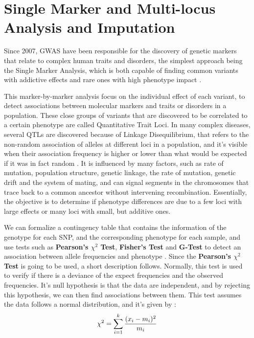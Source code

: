 \section{Single Marker and Multi-locus Analysis and Imputation}


Since 2007, \gls{GWAS} have been responsible for the discovery of genetic markers that relate to complex human traits and disorders, the simplest approach being the Single Marker Analysis, which is both capable of finding common variants with addictive effects and rare ones with high phenotype impact \cite{scott2007genome}.
 
This marker-by-marker analysis focus on the individual effect of each variant, to detect associations between molecular markers and traits or disorders in a population. These close groups of variants that are discovered to be correlated to a certain phenotype are called Quantitative Trait Loci. In many complex diseases, several \gls{QTL}s are discovered because of Linkage Disequilibrium, that refers to the non-random association of alleles at different loci in a population, and it's visible when their association frequency is higher or lower than what would be expected if it was in fact random \cite{slatkin2008linkage}. It is influenced by many factors, such as rate of mutation, population structure, genetic linkage, the rate of mutation, genetic drift and the system of mating, and can signal segments in the chromosomes that trace back to a common ancestor without intervening recombination. Essentially, the objective is to determine if phenotype differences are due to a few loci with large effects or many loci with small, but additive ones.  

We can formalize a contingency table that contains the information of the genotype for each \gls{SNP}, and the corresponding phenotype for each sample, and use tests such as \textbf{Pearson's $\chi^2$ Test}, \textbf{Fisher's Test} and \textbf{G-Test} to detect an association between allele frequencies and phenotype \cite{zhang2012mining}. Since the \textbf{Pearson's $\chi^2$ Test} is going to be used, a short description follows. Normally, this test is used to verify if there is a deviance of the expect frequencies and the observed frequencies. It's null hypothesis is that the data are independent, and by rejecting this hypothesis, we can then find associations between them. This test assumes the data follows a normal distribution, and it's given by \cite{pearson1900x}: 
\begin{equation}
	\chi^2 = \sum_{i = 1}^{k}\frac{(x_i - m_i)^2}{m_i} \\
\end{equation}
 
